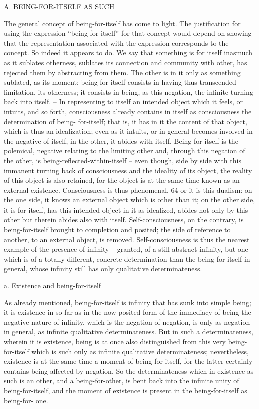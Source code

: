 A. BEING-FOR-ITSELF AS SUCH

The general concept of being-for-itself has come to light. The justification
for using the expression “being-for-itself” for that concept would depend on
showing that the representation associated with the expression corresponds
to the concept. So indeed it appears to do. We say that something is for itself
inasmuch as it sublates otherness, sublates its connection and community
with other, has rejected them by abstracting from them. The other is in
it only as something sublated, as its moment; being-for-itself consists in
having thus transcended limitation, its otherness; it consists in being, as
this negation, the infinite turning back into itself. – In representing to itself
an intended object which it feels, or intuits, and so forth, consciousness
already contains in itself as consciousness the determination of being-
for-itself; that is, it has in it the content of that object, which is thus
an idealization; even as it intuits, or in general becomes involved in the
negative of itself, in the other, it abides with itself. Being-for-itself is the
polemical, negative relating to the limiting other and, through this negation
of the other, is being-reflected-within-itself – even though, side by side with
this immanent turning back of consciousness and the ideality of its object,
the reality of this object is also retained, for the object is at the same time
known as an external existence. Consciousness is thus phenomenal, 64 or
it is this dualism: on the one side, it knows an external object which is
other than it; on the other side, it is for-itself, has this intended object
in it as idealized, abides not only by this other but therein abides also
with itself. Self-consciousness, on the contrary, is being-for-itself brought to
completion and posited; the side of reference to another, to an external
object, is removed. Self-consciousness is thus the nearest example of the
presence of infinity – granted, of a still abstract infinity, but one which is
of a totally different, concrete determination than the being-for-itself in
general, whose infinity still has only qualitative determinateness.

a. Existence and being-for-itself

As already mentioned, being-for-itself is infinity that has sunk into simple
being; it is existence in so far as in the now posited form of the immediacy
of being the negative nature of infinity, which is the negation of negation,
is only as negation in general, as infinite qualitative determinateness. But
in such a determinateness, wherein it is existence, being is at once also
distinguished from this very being-for-itself which is such only as infinite
qualitative determinateness; nevertheless, existence is at the same time a
moment of being-for-itself, for the latter certainly contains being affected
by negation. So the determinateness which in existence as such is an other,
and a being-for-other, is bent back into the infinite unity of being-for-itself,
and the moment of existence is present in the being-for-itself as being-for-
one.

